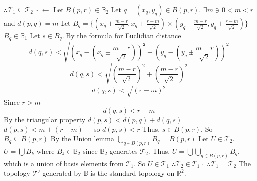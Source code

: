 \documentclass[12pt]{article}
\begin{document}
	\newline
	\(\therefore \mathcal{T}_1 \subseteq \mathcal{T}_2\)
	\newline \(\square\) \newline \newline
	\(\leftarrow\) Let \(B(p,r) \in \mathbb{B}_2\) \newline
	Let \(q = (x_q, y_q) \in B(p,r)\). \newline
	\(\exists m \ni 0 < m < r\) and \(d(p,q) = m\) \newline
	Let \(B_q = \{(x_q + \frac{m-r}{\sqrt{2}}, x_q +\frac{r-m}{\sqrt{2}}) \times (y_q + \frac{m-r}{\sqrt{2}}, y_q +\frac{r-m}{\sqrt{2}})\}\) \newline
	\(B_q \in \mathbb{B}_1\)
	\newline
	Let \(s \in B_q\). \newline
	By the formula for Euclidian distance
	\[d(q,s)<\sqrt{\left(x_q-(x_q \pm \frac{m-r}{\sqrt{2}})\right)^2+\left(y_q-(y_q \pm \frac{m-r}{\sqrt{2}})\right)^2}\]
	\[d(q,s)<\sqrt{\left(\frac{m-r}{\sqrt{2}}\right)^2 + \left(\frac{m-r}{\sqrt{2}}\right)^2}\]
	\[d(q,s)<\sqrt{(r-m)^2}\]
	Since \(r>m\)
	\[d(q,s)<r-m\]
	By the triangular property \newline
	\(d(p,s)<d(p,q)+d(q,s)\) \newline
	\(d(p,s)<m+(r-m)\)\ \ \ so \(d(p,s)<r\) \newline
	\newline
	Thus, \(s \in B(p,r)\).
	\newline
	So \(B_q \subseteq B(p,r)\) \newline
	By the Union lemma \(\bigcup_{q \in B(p,r)}B_q=B(p,r)\)
	\newline \newline
	Let \(U \in \mathcal{T}_2\).
	\newline \(U = \bigcup B_k\) where \(B_k \in \mathbb{B}_2\) since \(\mathbb{B}_2\) generates \(\mathcal{T}_2\). \newline
	Thus, \(U = \bigcup \bigcup_{q \in B(p,r)}B_q\), which is a union of basis elements from \(\mathcal{T}_1\). \newline
	So \(U \in \mathcal{T}_1\) \newline
	\(\therefore \mathcal{T}_2 \in \mathcal{T}_1\)
	\newline \(\square\) \newline
	\(\therefore \mathcal{T}_1 = \mathcal{T}_2\) \newline
	The topology \(\mathcal{T}'\) generated by \(\mathbb{B}\) is the standard topology on \(\mathbb{R}^2\).
\end{document}

